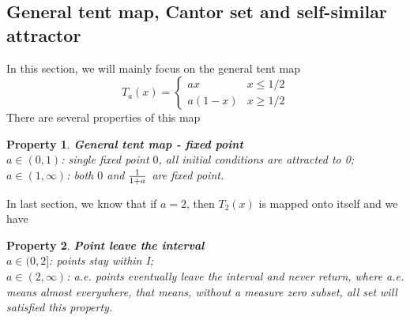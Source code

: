 \documentclass[12pt]{article}
\theoremstyle{plain}
\newtheorem{property}{\textbf{Property}}[section]
\begin{document}
\subsection{General tent map, Cantor set and self-similar attractor}
In this section, we will mainly focus on the general tent map
$$
T_a(x) = \left\{\begin{array}{ll}
ax      & x \leq 1/2 \\
a(1-x)  & x \geq 1/2
\end{array}\right.
$$ 
There are several properties of this map
\begin{property} \textbf{General tent map - fixed point}
\\\noindent $a \in (0, 1)$: single fixed point $0$, all initial conditions are attracted to 0;
\\\noindent $a \in (1, \infty)$: both $0$ and $1\over 1+a$ are fixed point.
\end{property}
In last section, we know that if $a = 2$, then $T_2(x)$ is mapped onto itself and we have 
\begin{property} \textbf{Point leave the interval}
\\\noindent $a \in (0, 2]$: points stay within I;
\\\noindent $a \in (2, \infty)$: a.e. points eventually leave the interval and never return, where a.e. means almost everywhere, that means, without a measure zero subset, all set will satisfied this property.
\end{property}
\end{document}
